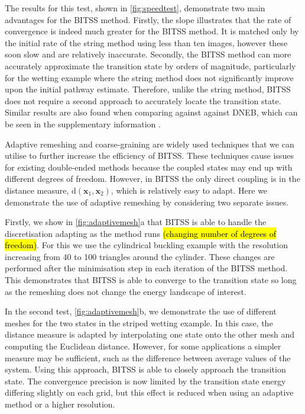 \documentclass[aps,prl,twocolumn,10pt,groupedaddress]{revtex4-2}
\begin{document}
The results for this test, shown in \cref{fig:speedtest}, demonstrate two main advantages for the BITSS method.
Firstly, the slope illustrates that the rate of convergence is indeed much greater for the BITSS method.
It is matched only by the initial rate of the string method using less than ten images, however these soon slow and are relatively inaccurate.
Secondly, the BITSS method can more accurately approximate the transition state by orders of magnitude, particularly for the wetting example where the string method does not significantly improve upon the initial pathway estimate.
Therefore, unlike the string method, BITSS does not require a second approach to accurately locate the transition state.
Similar results are also found when comparing against against DNEB, which can be seen in the supplementary information \cite{Note1}.


Adaptive remeshing and coarse-graining are widely used techniques that we can utilise to further increase the efficiency of BITSS.
These techniques cause issues for existing double-ended methods because the coupled states may end up with different degrees of freedom.
However, in BITSS the only direct coupling is in the distance measure, $\mathrm{d}(\bm{x}_1,\bm{x}_2)$, which is relatively easy to adapt.
Here we demonstrate the use of adaptive remeshing by considering two separate issues.

Firstly, we show in \cref{fig:adaptivemesh}a that BITSS is able to handle the discretisation adapting as the method runs \hl{(changing number of degrees of freedom)}.
For this we use the cylindrical buckling example with the resolution increasing from 40 to 100 triangles around the cylinder.
These changes are performed after the minimisation step in each iteration of the BITSS method.
This demonstrates that BITSS is able to converge to the transition state so long as the remeshing does not change the energy landscape of interest.

In the second test, \cref{fig:adaptivemesh}b, we demonstrate the use of different meshes for the two states in the striped wetting example.
In this case, the distance measure is adapted by interpolating one state onto the other mesh and computing the Euclidean distance.
However, for some applications a simpler measure may be sufficient, such as the difference between average values of the system.
Using this approach, BITSS is able to closely approach the transition state.
The convergence precision is now limited by the transition state energy differing slightly on each grid, but this effect is reduced when using an adaptive method or a higher resolution.
\end{document}
